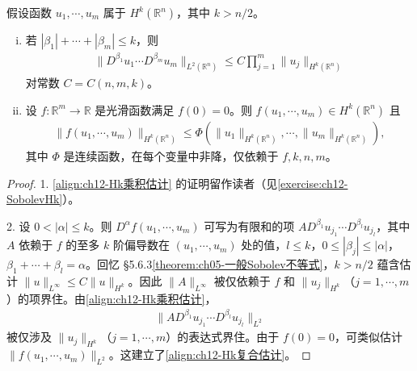 \documentclass[../../main.tex]{subfiles}
\begin{document}
\begin{theorem}\label{theorem:ch05-Sobolev嵌入}假设函数 $u_1,\cdots,u_m$ 属于 $H^k(\mathbb{R}^n)$，其中 $k>n/2$。
\begin{enumerate}[(i)]
\item 若 $|\beta_1|+\cdots+|\beta_m|\leqslant k$，则
\begin{align}
\|D^{\beta_1}u_1\cdots D^{\beta_m}u_m\|_{L^2(\mathbb{R}^n)}\leqslant C\prod_{j=1}^m\|u_j\|_{H^k(\mathbb{R}^n)}
\label{align:ch12-Hk乘积估计}
\end{align}
对常数 $C=C(n,m,k)$。
\item 设 $f:\mathbb{R}^m\to\mathbb{R}$ 是光滑函数满足 $f(0)=0$。则 $f(u_1,\cdots,u_m)\in H^k(\mathbb{R}^n)$ 且
\begin{align}
\|f(u_1,\cdots,u_m)\|_{H^k(\mathbb{R}^n)}\leqslant\Phi(\|u_1\|_{H^k(\mathbb{R}^n)},\cdots,\|u_m\|_{H^k(\mathbb{R}^n)}),
\label{align:ch12-Hk复合估计}
\end{align}
其中 $\Phi$ 是连续函数，在每个变量中非降，仅依赖于 $f,k,n,m$。
\end{enumerate}
\end{theorem}

\begin{proof}
1. \eqref{align:ch12-Hk乘积估计} 的证明留作读者（见\cref{exercise:ch12-SobolevHk}）。

2. 设 $0<|\alpha|\leqslant k$。则 $D^\alpha f(u_1,\cdots,u_m)$ 可写为有限和的项 $AD^{\beta_1}u_{j_1}\cdots D^{\beta_l}u_{j_l}$，其中 $A$ 依赖于 $f$ 的至多 $k$ 阶偏导数在 $(u_1,\cdots,u_m)$ 处的值，$l\leqslant k$，$0\leqslant|\beta_j|\leqslant|\alpha|$，$\beta_1+\cdots+\beta_l=\alpha$。回忆 \S5.6.3\cref{theorem:ch05-一般Sobolev不等式}，$k>n/2$ 蕴含估计 $\|u\|_{L^\infty}\leqslant C\|u\|_{H^k}$。因此 $\|A\|_{L^\infty}$ 被仅依赖于 $f$ 和 $\|u_j\|_{H^k}$（$j=1,\cdots,m$）的项界住。由\eqref{align:ch12-Hk乘积估计}，
\begin{align*}
\|AD^{\beta_1}u_{j_1}\cdots D^{\beta_l}u_{j_l}\|_{L^2}
\end{align*}
被仅涉及 $\|u_j\|_{H^k}$（$j=1,\cdots,m$）的表达式界住。由于 $f(0)=0$，可类似估计 $\|f(u_1,\cdots,u_m)\|_{L^2}$。这建立了\eqref{align:ch12-Hk复合估计}。
\end{proof}
\end{document}
